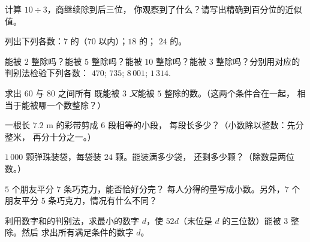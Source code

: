 \begin{exercise}[$\star$]\label{exo:g5:division:4}
计算 $10 \div 3$，商继续除到后三位，
你观察到了什么？请写出精确到百分位的近似值。
\end{exercise}

\begin{exercise}[$\star$]\label{exo:g5:division:5}
列出下列各数：$7$ 的（$70$ 以内）；$18$ 的；
$24$ 的。
\end{exercise}

\begin{exercise}[$\star$]\label{exo:g5:division:6}
能被 $2$ 整除吗？能被 $5$ 整除吗？能被 $10$ 整除吗？能被 $3$ 整除吗？分别用对应的判别法检验下列各数：
$470$; \quad $735$; \quad $8\,001$; \quad $1\,314$.
\end{exercise}

\begin{exercise}[$\star$]\label{exo:g5:division:7}
求出 $60$ 与 $80$ 之间所有
既能被 $3$ \emph{又}能被 $5$ 整除的数。（这两个条件合在一起，
相当于能被哪一个数整除？）
\end{exercise}

\begin{exercise}[$\star$]\label{exo:g5:division:8}
一根长 $7.2$ m 的彩带剪成 $6$ 段相等的小段，
每段长多少？（小数除以整数：先分整米，
再分十分之一。）
\end{exercise}

\begin{exercise}[$\star$]\label{exo:g5:division:9}
$1\,000$ 颗弹珠装袋，每袋装 $24$ 颗。能装满多少袋，
还剩多少颗？（除数是两位数。）
\end{exercise}

\begin{exercise}[$\star\star$]\label{exo:g5:division:10}
$5$ 个朋友平分 $7$ 条巧克力，能否恰好分完？
每人分得的量写成小数。另外，$7$ 个朋友平分
$5$ 条巧克力，情况有什么不同？
\end{exercise}

\begin{exercise}[$\star\star$]\label{exo:g5:division:11}
利用数字和的判别法，求最小的数字 $d$，使
$52d$（末位是 $d$ 的三位数）能被 $3$ 整除。然后
求出所有满足条件的数字 $d$。
\end{exercise}
